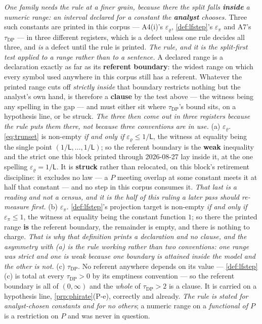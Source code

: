 \emph{One family needs the rule at a finer grain, because there the split falls \textbf{inside} a
numeric range: an interval declared for a constant the \textbf{analyst} chooses.} Three such constants
are printed in this corpus --- A4(i)'s $\varepsilon_\varrho$, \cref{def:lfstep}'s $\varepsilon_\pi$ and
A7's $\tau_{\mathrm{DP}}$ --- in three different registers, which is a defect unless one rule decides all
three, and \emph{is} a defect until the rule is printed. \emph{The rule, and it is the split-first test
applied to a range rather than to a sentence.} A declared range is a declaration exactly as far as its
\textbf{referent boundary}: the widest range on which every symbol used anywhere in this corpus still has
a referent. Whatever the printed range cuts off \emph{strictly inside} that boundary restricts nothing
but the analyst's own hand, is therefore a \textbf{clause} by the test above --- the witness being any
spelling in the gap --- and must either sit where $\tau_{\mathrm{DP}}$'s bound sits, on a hypothesis
line, or be struck. \emph{The three then come out in three registers because the rule puts them there,
not because three conventions are in use.}
\textup{(a)} $\varepsilon_\varrho$. \eqref{eq:trunset} is non-empty \emph{if and only if}
$\varepsilon_\varrho\le1/\mathsf L$, the witness at equality being the single point
$(1/\mathsf L,\dots,1/\mathsf L)$; so the referent boundary is the \textbf{weak} inequality and the strict
one this block printed through 2026-08-27 lay inside it, at the one spelling
$\varepsilon_\varrho=1/\mathsf L$. It is \textbf{struck} rather than relocated, on this block's
retirement discipline: it excludes no law --- a $P$ meeting overlap at some constant meets it at half
that constant --- and no step in this corpus consumes it. \emph{That last is a reading and not a census,
and it is the half of this ruling a later pass should re-measure first.}
\textup{(b)} $\varepsilon_\pi$. \cref{def:lfstep}'s projection target is non-empty \emph{if and only if}
$\varepsilon_\pi\le1$, the witness at equality being the constant function $1$; so there the printed
range \textbf{is} the referent boundary, the remainder is empty, and there is nothing to charge.
\emph{That is why that definition prints a declaration and no clause, and the asymmetry with
\textup{(a)} is the rule working rather than two conventions: one range was strict and one is weak
because one boundary is attained inside the model and the other is not.}
\textup{(c)} $\tau_{\mathrm{DP}}$. No referent anywhere depends on its value ---
\cref{def:lfstep}\textup{(c)} is total at every $\tau_{\mathrm{DP}}>0$ by its emptiness convention ---
so the referent boundary is all of $(0,\infty)$ and the \emph{whole} of $\tau_{\mathrm{DP}}>2$ is a
clause. It is carried on a hypothesis line, \cref{prp:phirate}\textup{(P-e)}, correctly and already.
\emph{The rule is stated for analyst-chosen constants and for no others}; a numeric range on a
\emph{functional of $P$} is a restriction on $P$ and was never in question.

